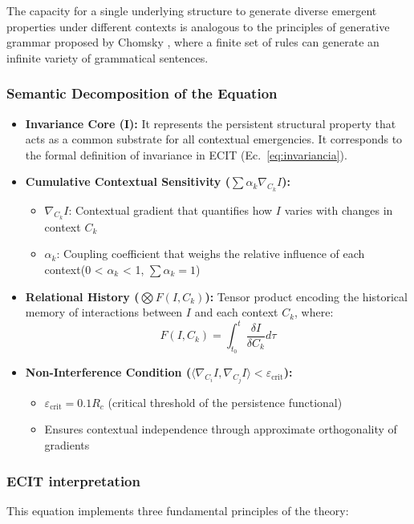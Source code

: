 \documentclass{article}
\begin{document}
\bigskip
\noindent The capacity for a single underlying structure to generate diverse emergent properties under different contexts is analogous to the principles of generative grammar proposed by Chomsky \cite{Chomsky1957}, where a finite set of rules can generate an infinite variety of grammatical sentences.


\subsubsection{Semantic Decomposition of the Equation}
\begin{itemize}
\item \textbf{Invariance Core (I):} It represents the persistent structural property that acts as a common substrate for all contextual emergencies. It corresponds to the formal definition of invariance in ECIT (Ec.~\ref{eq:invariancia}).

\item \textbf{Cumulative Contextual Sensitivity ($\sum\alpha_k\nabla_{C_k}I$):}
\begin{itemize}
\item $\nabla_{C_k}I$: Contextual gradient that quantifies how $I$ varies with changes in context $C_k$
\item $\alpha_k$: Coupling coefficient that weighs the relative influence of each context(0 < $\alpha_k$ < 1, $\sum\alpha_k = 1$)
\end{itemize}

\item \textbf{Relational History ($\bigotimes F(I,C_k)$):} Tensor product encoding the historical memory of interactions between $I$ and each context $C_k$, where:
\begin{equation}
F(I,C_k) = \int_{t_0}^t \frac{\delta I}{\delta C_k} d\tau
\end{equation}

\item \textbf{Non-Interference Condition ($\langle\nabla_{C_i}I, \nabla_{C_j}I\rangle < \varepsilon_{\text{crit}}$):}
\begin{itemize}
\item $\varepsilon_{\text{crit}} = 0.1R_c$ (critical threshold of the persistence functional)
\item Ensures contextual independence through approximate orthogonality of gradients
\end{itemize}
\end{itemize}

\subsubsection{ECIT interpretation}
This equation implements three fundamental principles of the theory:
\end{document}
